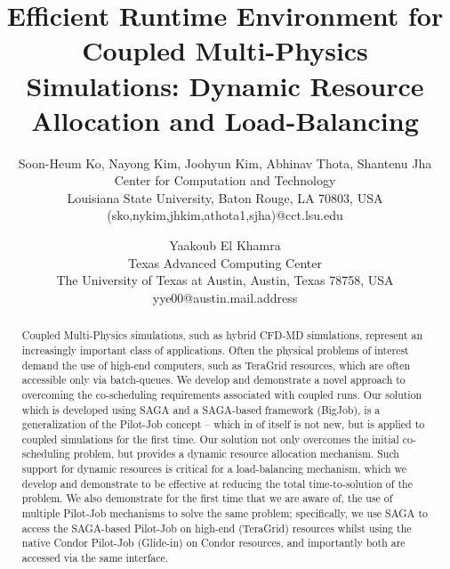 \documentclass[times, 10pt,twocolumn]{article}
\begin{document}
\title{Efficient Runtime Environment for Coupled Multi-Physics Simulations: Dynamic Resource Allocation and Load-Balancing}

\author{Soon-Heum Ko, Nayong Kim, Joohyun Kim, Abhinav Thota, Shantenu Jha\\
Center for Computation and Technology\\
Louisiana State University, Baton Rouge, LA 70803, USA\\
(sko,nykim,jhkim,athota1,sjha)@cct.lsu.edu\\
\and
Yaakoub El Khamra\\
Texas Advanced Computing Center\\
The University of Texas at Austin, Austin, Texas 78758, USA\\
yye00@austin.mail.address\\
}


\maketitle
\thispagestyle{empty}

\begin{abstract}
  Coupled Multi-Physics simulations, such as hybrid CFD-MD simulations, represent an increasingly important class of applications.  Often the physical problems of interest demand the use of high-end computers, such as TeraGrid resources, which are often accessible only via batch-queues.  We develop and demonstrate a novel approach to overcoming the co-scheduling requirements associated with coupled runs.  Our solution which is developed using SAGA and a SAGA-based framework (BigJob), is a generalization of the Pilot-Job concept -- which in of itself is not new, but is applied to coupled simulations for the first time.  Our solution not only overcomes the initial co-scheduling problem, but provides a dynamic resource allocation mechanism. Such support for dynamic resources is critical for a load-balancing mechanism, which we develop and demonstrate to be effective at reducing the total time-to-solution of the problem.  We also demonstrate for the first time that we are aware of, the use of multiple Pilot-Job mechanisms to solve the same problem; specifically, we use SAGA to access the SAGA-based Pilot-Job on high-end (TeraGrid) resources whilst using the native Condor Pilot-Job (Glide-in) on Condor resources, and importantly both are accessed via the same interface. 
\end{abstract}
\end{document}
